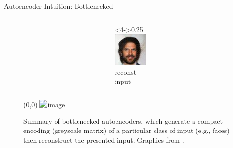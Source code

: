 \begin{frame}{Autoencoder Intuition: Bottlenecked}
\begin{figure}
\begin{columns}
\begin{column}{0.5\textwidth}
  \end{column}
  \begin{column}<4->{0.25\textwidth}
  \Large
  \centering
  ~\\[1.35ex]
  \phantom{input}
  \includegraphics[width=\textwidth]{img/curly-guy/latent-6}\\
  reconst \\ input
  \end{column}
  \end{columns}

  \vspace*{-9.35ex}

  \makebox(0,0){
    \includegraphics<3->[width=0.1\textwidth]{static/static-1}\hspace{0.075ex}
  }

  \vspace*{9.35ex}


  \caption{
  Summary of bottlenecked autoencoders, which generate a compact encoding  (greyscale matrix) of a particular class of input (e.g., faces) then reconstruct the presented input.
  Graphics from \cite{white2016sampling}.
  }
\end{figure}

\end{frame}

